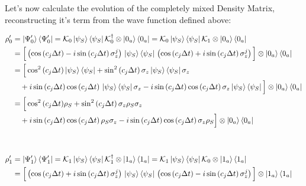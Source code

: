 \documentclass[a4paper,12pt]{article}
\begin{document}
	\begin{flushleft}
		Let's now calculate the evolution of the completely mixed Density Matrix, reconstructing it's term from the wave function defined above:
	\end{flushleft}
	\begin{align}
		\rho'_{0} &= \ket{\Psi'_{0}}\bra{\Psi'_{0}} = \mathcal{K}_{0} \ket{\psi_S}\bra{\psi_S} \mathcal{K}_{0}^{\dagger} \otimes \ket{0_a}\bra{0_a} = \mathcal{K}_{0} \ket{\psi_S}\bra{\psi_S} \mathcal{K}_{1} \otimes \ket{0_a}\bra{0_a} \notag \\
		& = \Big [ \left(\cos{\left( c_j \Delta t \right)} - i \sin{\left( c_j \Delta t \right)} \, \sigma_{z}^{j}\right) \, \ket{\psi_S}\bra{\psi_S} \, \left(\cos{\left( c_j \Delta t \right)} + i \sin{\left( c_j \Delta t \right)} \, \sigma_{z}^{j}\right) \Big]    \otimes \ket{0_a}\bra{0_a} \notag \\
		&= \Big [ \cos^{2}{\left(c_{j} \Delta t\right)} \ket{\psi_S}\bra{\psi_S} + \sin^{2}{\left(c_{j} \Delta t\right)} \, \sigma_{z} \ket{\psi_S}\bra{\psi_S} \sigma_{z} \notag  \\
		& \quad + i \sin{\left(c_{j} \Delta t \right)} \cos{\left(c_{j} \Delta t\right)} \,  \ket{\psi_S}\bra{\psi_S} \sigma_{z} -i \sin{\left(c_{j} \Delta t \right)} \cos{\left(c_{j} \Delta t\right)} \, \sigma_{z} \ket{\psi_S}\bra{\psi_S} \Big] \otimes \ket{0_a}\bra{0_a} \notag \\
		&= \Big [ \cos^{2}{\left(c_{j} \Delta t\right)} \rho_S + \sin^{2}{\left(c_{j} \Delta t\right)} \, \sigma_{z} \rho_S \sigma_{z} \notag \\
		& \quad + i \sin{\left(c_{j} \Delta t \right)} \cos{\left(c_{j} \Delta t\right)} \, \rho_S \sigma_{z} - i \sin{\left(c_{j} \Delta t \right)} \cos{\left(c_{j} \Delta t\right)} \, \sigma_{z} \rho_S \Big] \otimes \ket{0_a}\bra{0_a} \\
		\notag \\
		\notag \\
		\rho'_{1} &= \ket{\Psi'_{1}}\bra{\Psi'_{1}} = \mathcal{K}_{1} \ket{\psi_S}\bra{\psi_S} \mathcal{K}_{1}^{\dagger} \otimes \ket{1_a}\bra{1_a} = \mathcal{K}_{1} \ket{\psi_S}\bra{\psi_S} \mathcal{K}_{0} \otimes \ket{1_a}\bra{1_a} \notag \\
		& = \Big [ \left(\cos{\left( c_j \Delta t \right)} + i \sin{\left( c_j \Delta t \right)} \, \sigma_{z}^{j}\right) \, \ket{\psi_S}\bra{\psi_S} \, \left(\cos{\left( c_j \Delta t \right)} - i \sin{\left( c_j \Delta t \right)} \, \sigma_{z}^{j}\right) \Big]    \otimes \ket{1_a}\bra{1_a} \notag \\

\end{align}
\end{document}
